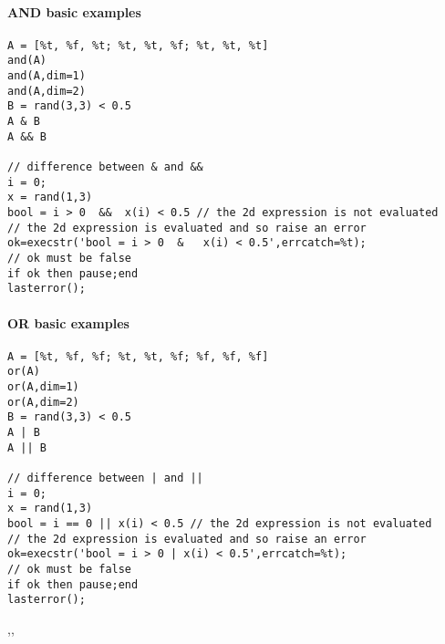 \begin{examples}
\paragraph{AND basic examples}
\begin{Verbatim}
A = [%t, %f, %t; %t, %t, %f; %t, %t, %t]
and(A)
and(A,dim=1)
and(A,dim=2)
B = rand(3,3) < 0.5
A & B
A && B

// difference between & and &&
i = 0;
x = rand(1,3)
bool = i > 0  &&  x(i) < 0.5 // the 2d expression is not evaluated
// the 2d expression is evaluated and so raise an error
ok=execstr('bool = i > 0  &   x(i) < 0.5',errcatch=%t);
// ok must be false
if ok then pause;end 
lasterror();
\end{Verbatim}

\paragraph{OR basic examples}
\begin{Verbatim}
A = [%t, %f, %f; %t, %t, %f; %f, %f, %f]
or(A)
or(A,dim=1)
or(A,dim=2)
B = rand(3,3) < 0.5
A | B
A || B
    
// difference between | and || 
i = 0;
x = rand(1,3)
bool = i == 0 || x(i) < 0.5 // the 2d expression is not evaluated
// the 2d expression is evaluated and so raise an error
ok=execstr('bool = i > 0 | x(i) < 0.5',errcatch=%t);
// ok must be false
if ok then pause;end 
lasterror();
\end{Verbatim}

\end{examples}

\begin{manseealso}
  ,,   

\end{manseealso}

